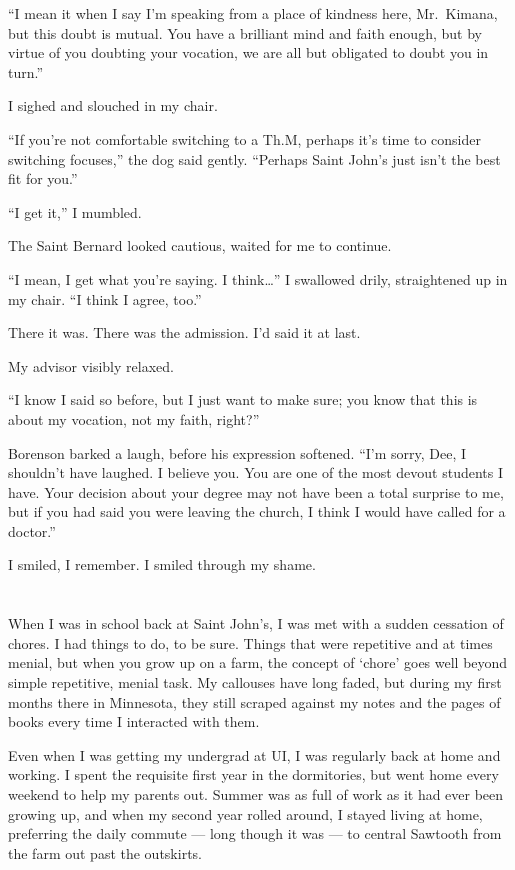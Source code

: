 ``I mean it when I say I'm speaking from a place of kindness here, Mr.~Kimana, but this doubt is mutual. You have a brilliant mind and faith enough, but by virtue of you doubting your vocation, we are all but obligated to doubt you in turn.''

I sighed and slouched in my chair.

``If you're not comfortable switching to a Th.M, perhaps it's time to consider switching focuses,'' the dog said gently. ``Perhaps Saint John's just isn't the best fit for you.''

``I get it,'' I mumbled.

The Saint Bernard looked cautious, waited for me to continue.

``I mean, I get what you're saying. I think\ldots{}'' I swallowed drily, straightened up in my chair. ``I think I agree, too.''

There it was. There was the admission. I'd said it at last.

My advisor visibly relaxed.

``I know I said so before, but I just want to make sure; you know that this is about my vocation, not my faith, right?''

Borenson barked a laugh, before his expression softened. ``I'm sorry, Dee, I shouldn't have laughed. I believe you. You are one of the most devout students I have. Your decision about your degree may not have been a total surprise to me, but if you had said you were leaving the church, I think I would have called for a doctor.''

I smiled, I remember. I smiled through my shame.

\section{}

When I was in school back at Saint John's, I was met with a sudden cessation of chores. I had things to do, to be sure. Things that were repetitive and at times menial, but when you grow up on a farm, the concept of `chore' goes well beyond simple repetitive, menial task. My callouses have long faded, but during my first months there in Minnesota, they still scraped against my notes and the pages of books every time I interacted with them.

Even when I was getting my undergrad at UI, I was regularly back at home and working. I spent the requisite first year in the dormitories, but went home every weekend to help my parents out. Summer was as full of work as it had ever been growing up, and when my second year rolled around, I stayed living at home, preferring the daily commute --- long though it was --- to central Sawtooth from the farm out past the outskirts.

